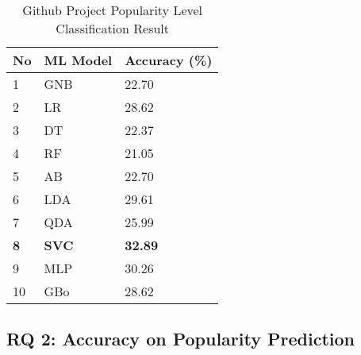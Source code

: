\begin{table}[]
\begin{tabular}{|l|l|l|}
\hline
{\color[HTML]{000000} \textbf{No}} & {\color[HTML]{000000} \textbf{ML Model}} & {\color[HTML]{000000} \textbf{Accuracy (\%)}}        \\ \hline
{\color[HTML]{000000} 1}           & {\color[HTML]{000000} GNB}               & {\color[HTML]{000000} 22.70} \\ \hline
{\color[HTML]{000000} 2}           & {\color[HTML]{000000} LR}                & {\color[HTML]{000000} 28.62}                         \\ \hline
{\color[HTML]{000000} 3}           & {\color[HTML]{000000} DT}                & {\color[HTML]{000000} 22.37}                         \\ \hline
{\color[HTML]{000000} 4}           & {\color[HTML]{000000} RF}                & {\color[HTML]{000000} 21.05}                         \\ \hline
{\color[HTML]{000000} 5}           & {\color[HTML]{000000} AB}                & {\color[HTML]{000000} 22.70}                         \\ \hline
{\color[HTML]{000000} 6}           & {\color[HTML]{000000} LDA}               & {\color[HTML]{000000} 29.61}                         \\ \hline
{\color[HTML]{000000} 7}           & {\color[HTML]{000000} QDA}               & {\color[HTML]{000000} 25.99}                         \\ \hline
{\color[HTML]{000000} \textbf{8}}  & {\color[HTML]{000000} \textbf{SVC}}      & {\color[HTML]{000000} \textbf{32.89}}                \\ \hline
{\color[HTML]{000000} 9}           & {\color[HTML]{000000} MLP}               & {\color[HTML]{000000} 30.26}                         \\ \hline
{\color[HTML]{000000} 10}          & {\color[HTML]{000000} GBo}               & {\color[HTML]{000000} 28.62}                         \\ \hline
\end{tabular}
\label{tblRQ1}
\caption{Github Project Popularity Level Classification Result}
\end{table}


\subsection{RQ 2: Accuracy on Popularity Prediction}

